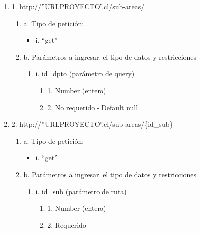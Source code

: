 \begin{enumerate}
    \item 1. http://”URLPROYECTO”.cl/sub-areas/
    \begin{enumerate}
        \item a. Tipo de petición:
            \begin{itemize}
               \item i. “get”
            \end{itemize}
        \item b. Parámetros a ingresar, el tipo de datos y restricciones
            \begin{enumerate}
                \item i. id\_dpto (parámetro de query)
                    \begin{enumerate}
                        \item 1. Number (entero)
                        \item 2. No requerido - Default null
                    \end{enumerate}
            \end{enumerate}
    \end{enumerate}

    \item 2. http://”URLPROYECTO”.cl/sub-areas/\{id\_sub\}
    \begin{enumerate}
        \item a. Tipo de petición:
            \begin{itemize}
               \item i. “get”
            \end{itemize}
        \item b. Parámetros a ingresar, el tipo de datos y restricciones
            \begin{enumerate}
                \item i. id\_sub (parámetro de ruta)
                    \begin{enumerate}
                        \item 1. Number (entero)
                        \item 2. Requerido
                    \end{enumerate}
            \end{enumerate}
    \end{enumerate}


\end{enumerate}
